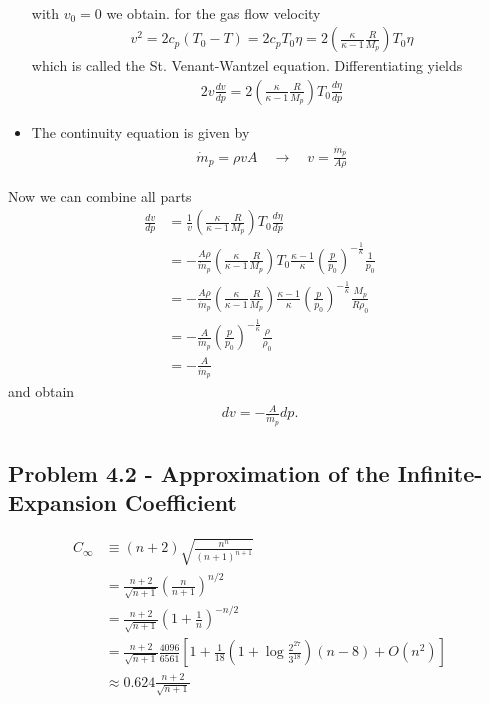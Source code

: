 \documentclass[../main.tex]{subfiles}
\begin{document}
\begin{itemize}
\begin{align}
\end{align}
with $v_0=0$ we obtain. for the gas flow velocity
\begin{align}
    v^2=2c_p(T_0-T)=2c_pT_0\eta=2\left(\frac{\kappa}{\kappa-1}\frac{R}{M_p}\right)T_0\eta
\end{align}
which is called the St. Venant-Wantzel equation. Differentiating yields
\begin{align}
2v\frac{dv}{dp}=2\left(\frac{\kappa}{\kappa-1}\frac{R}{M_p}\right)T_0\frac{d\eta}{dp}
\end{align}
\item The continuity equation is given by
\begin{align}
    \dot m_p=\rho vA\quad\rightarrow\quad v=\frac{\dot m_p}{A\rho}
\end{align}
\end{itemize}
Now we can combine all parts
\begin{align}
    \frac{dv}{dp}
    &=\frac{1}{v}\left(\frac{\kappa}{\kappa-1}\frac{R}{M_p}\right)T_0\frac{d\eta}{dp}\\
    &=-\frac{A\rho}{\dot m_p}\left(\frac{\kappa}{\kappa-1}\frac{R}{M_p}\right)T_0\frac{\kappa-1}{\kappa}\left(\frac{p}{p_0}\right)^{-\frac{1}{\kappa}}\frac{1}{p_0}\\
    &=-\frac{A\rho}{\dot m_p}\left(\frac{\kappa}{\kappa-1}\frac{R}{M_p}\right)\frac{\kappa-1}{\kappa}\left(\frac{p}{p_0}\right)^{-\frac{1}{\kappa}}\frac{M_p}{R\rho_0}\\
    &=-\frac{A}{\dot m_p}\left(\frac{p}{p_0}\right)^{-\frac{1}{\kappa}}\frac{\rho}{\rho_0}\\
    &=-\frac{A}{\dot m_p}
\end{align}
and obtain
\begin{align}
    dv=-\frac{A}{\dot m_p}dp.
\end{align}

\subsection{Problem 4.2 - Approximation of the Infinite-Expansion Coefficient}
\begin{align}
    C_\infty&\equiv(n+2)\sqrt{\frac{n^n}{(n+1)^{n+1}}}\\
    &=\frac{n+2}{\sqrt{n+1}}\left(\frac{n}{n+1}\right)^{n/2}\\
    &=\frac{n+2}{\sqrt{n+1}}\left(1+\frac{1}{n}\right)^{-n/2}\\
    &=\frac{n+2}{\sqrt{n+1}}\frac{4096}{6561}\left[1+\frac{1}{18}\left(1+\log\frac{2^{27}}{3^{18}}\right)(n-8) +O\left(n^2\right)\right]\\
    &\approx 0.624 \frac{n+2}{\sqrt{n+1}}
\end{align}
\end{document}
